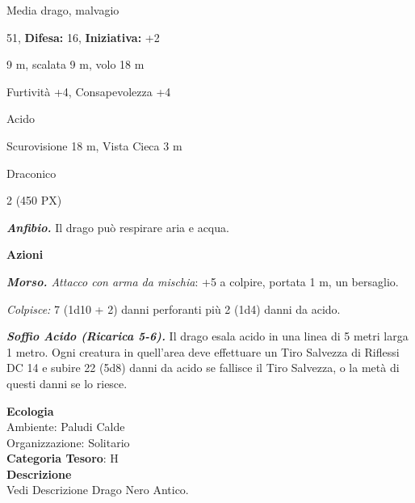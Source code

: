 \begin{multicols}{2}
{
\noindent
\begin{description}[noitemsep, topsep=0pt, parsep=0pt, partopsep=0pt, leftmargin=0cm, labelwidth=2.2cm]
	\item[\textbf{Taglia/Tipo:}] Media drago, malvagio
	\item[\textbf{Caratt.:}] 
	\item[\textbf{Punti Ferita:}] 51,  \textbf{Difesa:} 16,  \textbf{Iniziativa:} +2
	\item[\textbf{Movimento:}] 9 m, scalata 9 m, volo 18 m
	\item[\textbf{Tiri Salvez.:}] 
	\item[\textbf{Comp.:}] Furtività +4, Consapevolezza +4
	\item[\textbf{Imm. Danni:}] Acido
	\item[\textbf{Sensi:}] Scurovisione 18 m, Vista Cieca 3 m
	\item[\textbf{Linguaggi:}] Draconico
	\item[\textbf{Sfida:}] 2 (450 PX)\smallskip
\end{description}

\emph{\textbf{Anfibio.}} Il drago può respirare aria e acqua.

\textbf{Azioni}

\emph{\textbf{Morso.} Attacco con arma da mischia}: +5 a colpire, portata 1 m, un bersaglio.

\emph{Colpisce:} 7 (1d10 + 2) danni perforanti più 2 (1d4) danni da acido.

\emph{\textbf{Soffio Acido (Ricarica 5-6).}} Il drago esala acido in una linea di 5 metri larga 1 metro. Ogni creatura in quell'area deve effettuare un Tiro Salvezza di Riflessi DC 14 e subire 22 (5d8) danni da acido se fallisce il Tiro Salvezza, o la metà di questi danni se lo riesce.

\textbf{Ecologia}\\
Ambiente: Paludi Calde\\
Organizzazione: Solitario\\
\textbf{Categoria Tesoro}: H\\
\textbf{Descrizione}\\
Vedi Descrizione Drago Nero Antico.

}
\end{multicols}
